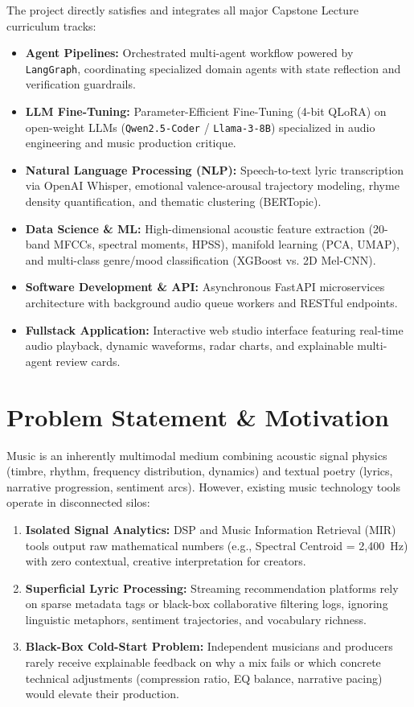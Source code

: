 \documentclass[11pt,a4paper]{article}
\begin{document}
The project directly satisfies and integrates all major Capstone Lecture curriculum tracks:
\begin{itemize}
    \item \textbf{Agent Pipelines:} Orchestrated multi-agent workflow powered by \texttt{LangGraph}, coordinating specialized domain agents with state reflection and verification guardrails.
    \item \textbf{LLM Fine-Tuning:} Parameter-Efficient Fine-Tuning (4-bit QLoRA) on open-weight LLMs (\texttt{Qwen2.5-Coder} / \texttt{Llama-3-8B}) specialized in audio engineering and music production critique.
    \item \textbf{Natural Language Processing (NLP):} Speech-to-text lyric transcription via OpenAI Whisper, emotional valence-arousal trajectory modeling, rhyme density quantification, and thematic clustering (BERTopic).
    \item \textbf{Data Science \& ML:} High-dimensional acoustic feature extraction (20-band MFCCs, spectral moments, HPSS), manifold learning (PCA, UMAP), and multi-class genre/mood classification (XGBoost vs. 2D Mel-CNN).
    \item \textbf{Software Development \& API:} Asynchronous FastAPI microservices architecture with background audio queue workers and RESTful endpoints.
    \item \textbf{Fullstack Application:} Interactive web studio interface featuring real-time audio playback, dynamic waveforms, radar charts, and explainable multi-agent review cards.
\end{itemize}

\section{Problem Statement \& Motivation}

Music is an inherently multimodal medium combining acoustic signal physics (timbre, rhythm, frequency distribution, dynamics) and textual poetry (lyrics, narrative progression, sentiment arcs). However, existing music technology tools operate in disconnected silos:
\begin{enumerate}
    \item \textbf{Isolated Signal Analytics:} DSP and Music Information Retrieval (MIR) tools output raw mathematical numbers (e.g., Spectral Centroid = 2,400~Hz) with zero contextual, creative interpretation for creators.
    \item \textbf{Superficial Lyric Processing:} Streaming recommendation platforms rely on sparse metadata tags or black-box collaborative filtering logs, ignoring linguistic metaphors, sentiment trajectories, and vocabulary richness.
    \item \textbf{Black-Box Cold-Start Problem:} Independent musicians and producers rarely receive explainable feedback on why a mix fails or which concrete technical adjustments (compression ratio, EQ balance, narrative pacing) would elevate their production.
\end{enumerate}
\end{document}
